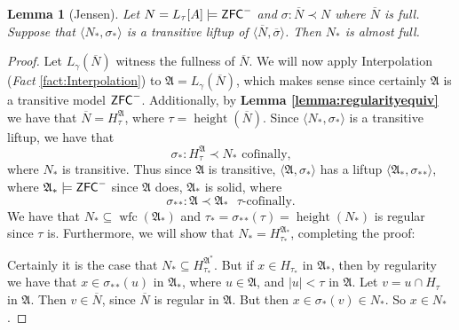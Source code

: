 \documentclass{amsart}
\newtheorem{lemma}[theorem]{Lemma}
\theoremstyle{definition}
\theoremstyle{remark}
\newcommand{\N}{{\overline{N}}}
\newcommand{\ZFC}{\textup{\ensuremath{\textsf{ZFC}}}}
\DeclareMathOperator{\height}{height}
\DeclareMathOperator{\wfc}{wfc}
\begin{document}
\begin{lemma}[Jensen]\label{lemma:liftupfull} Let $N =L_\tau[A] \models \ZFC^-$ and $\sigma: \N \prec N$ where $\N$ is full. Suppose that $\langle N_*, \sigma_* \rangle$ is a transitive liftup of $\langle \N, \overline \sigma \rangle$. Then $N_*$ is almost full. \end{lemma}
\begin{proof}
	Let $L_\gamma(\N)$ witness the fullness of $\N$. We will now apply Interpolation (\emph{Fact} \ref{fact:Interpolation}) to $\mathfrak A= L_\gamma(\N)$, which makes sense since certainly $\mathfrak A$ is a transitive model $\ZFC^-$. Additionally, by \textbf{Lemma \ref{lemma:regularityequiv}} we have that $\N = H_\tau^{\mathfrak A}$, where $\tau = \height(\N)$. Since $\langle N_*, \sigma_* \rangle$ is a transitive liftup, we have that $$\sigma_*: H_\tau^{\mathfrak A} \prec N_* \text{ cofinally,}$$ where $N_*$ is transitive. Thus since $\mathfrak A$ is transitive, $\langle \mathfrak A, \sigma_* \rangle$ has a liftup $\langle \mathfrak A_*, {\sigma_*}_* \rangle$, where $\mathfrak A_* \models \ZFC^-$ since $\mathfrak A$ does, $\mathfrak A_*$ is solid, where $${\sigma_*}_* : \mathfrak A \prec \mathfrak A_* \text{ $\tau$-cofinally.}$$ 
	We have that  $N_* \subseteq \wfc({\mathfrak A}_*)$ and $\tau_*= {\sigma_*}_*(\tau)=\height(N_*)$ is regular since $\tau$ is. Furthermore, we will show that $N_* = H_{\tau_*}^{\mathfrak A_*}$, completing the proof:
	
	Certainly it is the case that $N_* \subseteq H_{\tau_*}^{\mathfrak A^*}$. 
	But if $x \in H_{\tau_*}$ in $\mathfrak A_*$, then by regularity we have that $x \in {\sigma_*}_*(u)$ in $\mathfrak A_*$, where $u \in \mathfrak A$, and $|u| < \tau$ in $\mathfrak A$. Let $v=u \cap H_\tau$ in $\mathfrak A$. Then $v \in \N$, since $\N$ is regular in $\mathfrak A$. But then $x \in \sigma_*(v) \in N_*$. So $x \in N_*$.
\end{proof}
\end{document}
